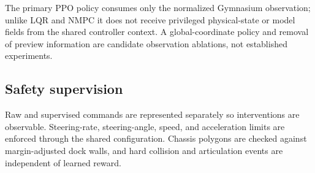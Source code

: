 The primary PPO policy consumes only the normalized Gymnasium observation;
unlike LQR and NMPC it does not receive privileged physical-state or model
fields from the shared controller context. A global-coordinate policy and
removal of preview information are candidate observation ablations, not
established experiments.

\subsection{Safety supervision}

\implemented{} Raw and supervised commands are represented separately so
interventions are observable. Steering-rate, steering-angle, speed, and
acceleration limits are enforced through the shared configuration. Chassis
polygons are checked against margin-adjusted dock walls, and hard collision and
articulation events are independent of learned reward.
